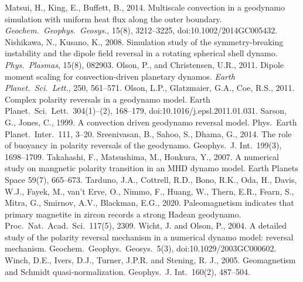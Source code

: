 \begin{thebibliography}{}
%
Matsui, H., King, E., Buffett, B., 2014. Multiscale convection in a geodynamo simulation with uniform heat flux along the outer boundary. {\it Geochem.\ Geophys.\ Geosys.}, 15(8), 3212--3225, doi:10.1002/2014GC005432.
%
%
Nishikawa, N., Kusano, K., 2008. Simulation study of the symmetry-breaking instability and the dipole field reversal in a rotating spherical shell dynamo. {\it Phys.\ Plasmas}, 15(8), 082903.
%
%
Olson, P., and Christensen, U.R., 2011. Dipole moment scaling for convection-driven planetary dynamos. {\it Earth Planet.\ Sci.\ Lett.}, 250, 561--571.
%
Olson, L.P., Glatzmaier, G.A., Coe, R.S., 2011. Complex polarity reversals in a geodynamo model. Earth Planet.\ Sci.\ Lett.\ 304(1)--(2), 168--179, doi:10.1016/j.epsl.2011.01.031.
%
Sarson, G., Jones, C., 1999. A convection driven geodynamo reversal model. Phys.\ Earth Planet.\ Inter.\ 111, 3--20.
%
Sreenivasan, B., Sahoo, S., Dhama, G., 2014. The role of buoyancy in polarity reversals of the geodynamo. Geophys.\ J. Int.\ 199(3), 1698--1709.
%
Takahashi, F., Matsushima, M., Honkura, Y., 2007. A numerical study on mangnetic polarity transition in an MHD dynamo model. Earth Planets Space 59(7), 665--673.
%
Tarduno, J.A., Cottrell, R.D., Bono, R.K., Oda, H., Davis, W.J., Fayek, M., van't Erve, O., Nimmo, F., Huang, W., Thern, E.R., Fearn, S., Mitra, G., Smirnov, A.V., Blackman, E.G., 2020. Paleomagnetism indicates that primary magnetite in zircon records a strong Hadean geodynamo. Proc.\ Nat.\ Acad.\ Sci.\ 117(5), 2309.
%
Wicht, J. and Olson, P., 2004. A detailed study of the polarity reversal mechanism in a numerical dynamo model: reversal mechanism. Geochem.\ Geophys.\ Geosys.\ 5(3), doi:10.1029/2003GC000602.
%
Winch, D.E., Ivers, D.J., Turner, J.P.R. and Stening, R. J., 2005. Geomagnetism and Schmidt quasi-normalization. Geophys.\ J. Int.\ 160(2), 487--504.

\end{thebibliography}